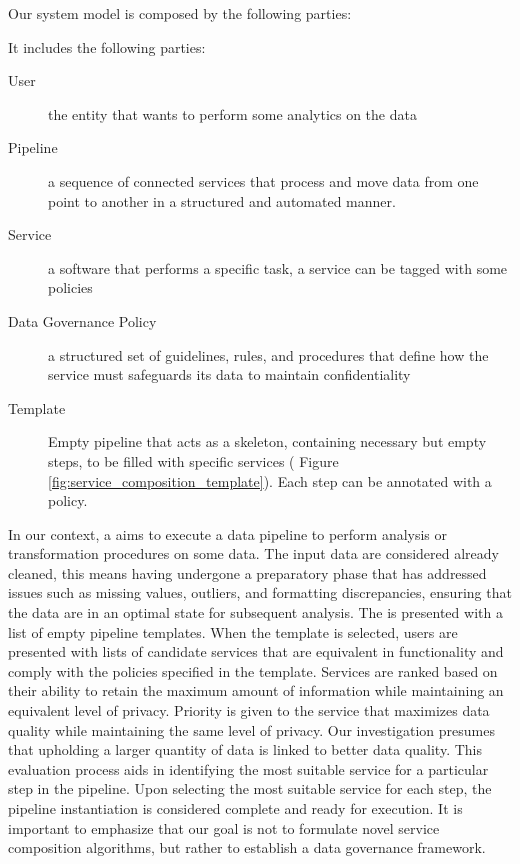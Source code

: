 Our system model is composed by the following parties:

It includes the following parties:
\begin{description}
  \item[User] the entity that wants to perform some analytics on the data
  \item[Pipeline] a sequence of connected services that process and move data from one point to another in a structured and automated manner.
  \item[Service] a software that performs a specific task, a service can be tagged with some policies %
  \item[Data Governance Policy] a structured set of guidelines, rules, and procedures that define how the service must safeguards its data to maintain confidentiality
  \item[Template] Empty pipeline that acts as a skeleton, containing necessary but empty steps, to be filled with specific services ( Figure \ref{fig:service_composition_template}). Each step can be annotated with a policy.

\end{description}


In our context, a \user aims to execute a data pipeline to perform analysis or transformation procedures on some data.
The input data are considered already cleaned, this means having undergone a preparatory phase that has addressed issues such as missing values,
outliers, and formatting discrepancies, ensuring that the data are in an optimal state for subsequent analysis.
The \user is presented with a list of empty pipeline templates.
When the template is selected, users are presented with lists of candidate services that are equivalent in functionality and comply with the policies specified in the template.
Services are ranked based on their ability to retain the maximum amount of information while maintaining an equivalent level of privacy.
Priority is given to the service that maximizes data quality while maintaining the same level of privacy.
Our investigation presumes that upholding a larger quantity of data is linked to better data quality.
This evaluation process aids in identifying the most suitable service for a particular step in the pipeline.
Upon selecting the most suitable service for each step, the pipeline instantiation is considered complete and ready for execution.
It is important to emphasize that our goal is not to formulate novel service composition algorithms, but rather to establish a data governance framework.

